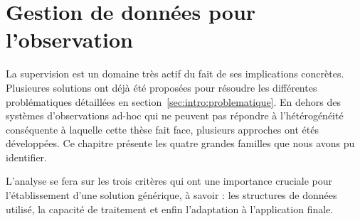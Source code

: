 \chapter{Gestion de données pour l'observation}
\minitoc

La supervision est un domaine très actif du fait de ses implications concrètes. Plusieures solutions ont déjà été proposées pour résoudre les différentes problématiques détaillées en section~\ref{sec:intro:problematique}. En dehors des systèmes d'observations ad-hoc qui ne peuvent pas répondre à l'hétérogénéité conséquente à laquelle cette thèse fait face, plusieurs approches ont étés développées. Ce chapitre présente les quatre grandes familles que nous avons pu identifier.

L'analyse se fera sur les trois critères qui ont une importance cruciale pour l'établissement d'une solution générique, à savoir : les structures de données utilisé, la capacité de traitement et enfin l'adaptation à l'application finale.









